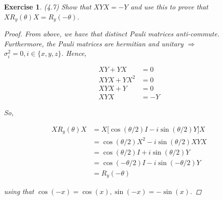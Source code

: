 \documentclass[11pt]{article}
\newcommand\0{\mathbf{0}}
\newcommand\<{\langle}
\renewcommand\>{\rangle}
\renewcommand\implies{\Rightarrow}
\newtheorem{exercise}[theorem]{Exercise}
\begin{document}
%	
%
%

\begin{exercise} (4.7) Show that $XY X = −Y$ and use this to prove that $XR_y(\theta)X = R_y(-\theta)$.

\begin{proof}
	From above, we have that distinct Pauli matrices anti-commute. Furthermore, the Pauli matrices are hermitian and unitary $\implies$ $\sigma_i^2 = 0, i \in \{x, y, z \}$. Hence, 
	
	\begin{align*}
	XY + YX &= 0 \\
	XYX + YX^2 &= 0 \\
	XYX + Y &=0 \\
	XYX &= -Y
	\end{align*}

So, 

\begin{align*}
XR_y(\theta)X &= X\big[\cos(\theta/2)I - i\sin(\theta / 2) Y\big]X \\
&= 	\cos(\theta/2)X^2 -i\sin(\theta/2)XYX \\
&= \cos(\theta/2)I + i \sin(\theta /2) Y \\
&= \cos(-\theta/2)I - i \sin(-\theta /2) Y \\
&= R_y(-\theta)
\end{align*}

using that $\cos(-x) = \cos(x), \sin(-x) = -\sin(x)$.
\end{proof}
\end{exercise}
\end{document}
